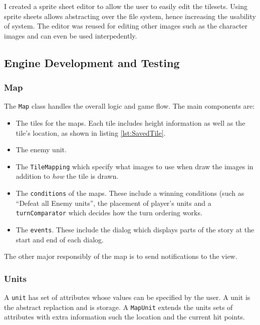 I created a sprite sheet editor to allow the user to easily edit the tilesets. Using sprite sheets allows abstracting over the file system, hence increasing the usability of system. The editor was reused for editing other images such as the character images and can even be used interpedently.

\clearpage
\subsection{Engine Development and Testing}
\label{sub:engine_development_and_testing}
\subsubsection{Map}
\label{ssub:maps}


The \texttt{Map} class handles the overall logic and game flow.   The main components are:
\begin{itemize}
\item The tiles for the maps. Each tile includes height information as well as the tile's location, as shown in listing \ref{lst:SavedTile}.

\item The enemy unit.     

\item The \texttt{TileMapping} which specify what images to use when draw the images in addition to \emph{how} the tile is drawn. 

\item  The \texttt{conditions} of the maps. These include a winning conditions (such as ``Defeat all Enemy units'',  the placement of player's units and a \texttt{turnComparator} which decides how the turn ordering works.  

\item  The \texttt{events}. These include the dialog which displays parts of the story at the start and end of each dialog. 
\end{itemize}

The other major responsibly of the map is to send notifications to the view.  

\subsubsection{Units}
\label{ssub:units}
A \texttt{unit} has set of attributes whose values can be specified by the user. A unit is the abstract replaction and is storage.  A \texttt{MapUnit} extends the units sets of attributes with extra information such the location and the current hit points.

